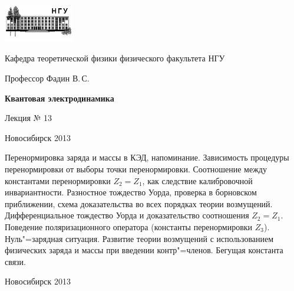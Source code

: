 \documentclass[12pt,pagesize,paper=192mm:108mm]{scrbook}
\begin{document}
\begin{titlepage}
  \vspace*{-1em}
  \begin{center}
    \includegraphics[width=0.23\textwidth]{../NSU-logo}

    Кафедра теоретической физики физического факультета НГУ
    \medskip

    \Large
    Профессор Фадин В.\,С.
    \bigskip

    \huge
    \textbf{Квантовая электродинамика}
    \bigskip

    \Large
    Лекция № 13
    \vfill

    \normalsize
    \vfill

    \normalsize \ccbysa\hspace{0.5em}  Новосибирск 2013
  \end{center}
\end{titlepage}
\vspace*{-1em}
\begin{center}
\vfill
  \begin{minipage}{0.65\linewidth}
    Перенормировка заряда и массы в КЭД, напоминание. Зависимость
    процедуры перенормировки от выборы точки
    перенормировки. Соотношение между константами перенормировки $Z_2
    = Z_1$, как следствие калибровочной инвариантности. Разностное
    тождество Уорда, проверка в борновском приближении, схема
    доказательства во всех порядках теории возмущений.
    Дифференциальное тождество Уорда и доказательство соотношения $Z_2
    = Z_1$. Поведение поляризационного оператора (константы
    перенормировки $Z_3$). Нуль"=зарядная ситуация.  Развитие теории
    возмущений с использованием физических заряда и массы при введении
    контр"=членов. Бегущая константа связи.
  \end{minipage}
  \vfill

  \normalsize \ccbysa\hspace{0.5em} Новосибирск 2013
\end{center}
\end{document}
